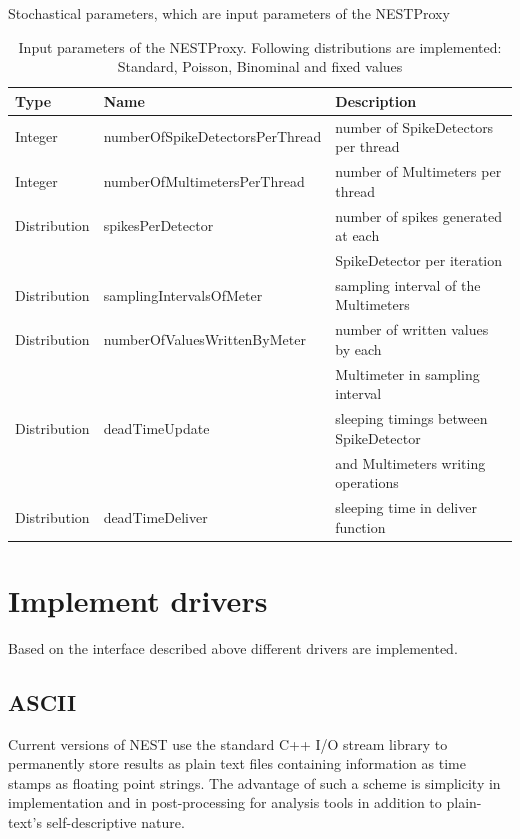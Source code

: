 \documentclass[]{YIC2015}
\begin{document}
\begin{table}[htdp]
\caption{Stochastical parameters, which are input parameters of the NESTProxy}
\centering
\begin{tabular}{lll}
\hline\hline
\textbf{Type} & \textbf{Name}                   & \textbf{Description} \\ \hline
Integer       & numberOfSpikeDetectorsPerThread & number of SpikeDetectors per thread  \\
Integer       & numberOfMultimetersPerThread    & number of Multimeters per thread  \\
Distribution  & spikesPerDetector               & number of spikes generated at each \\
	      &					& SpikeDetector per iteration  \\
Distribution  & samplingIntervalsOfMeter        & sampling interval of the Multimeters  \\
Distribution  & numberOfValuesWrittenByMeter    & number of written values by each \\
	      &					& Multimeter in sampling interval  \\
Distribution  & deadTimeUpdate                  & sleeping timings between SpikeDetector \\
	      &					& and Multimeters writing operations \\
Distribution  & deadTimeDeliver                 & sleeping time in deliver function  \\
\hline\hline
\end{tabular}
\label{tab:table-silva1}
\caption{Input parameters of the NESTProxy. Following distributions
are implemented: Standard, Poisson, Binominal and fixed values}
\end{table}

\section{Implement drivers}
Based on the interface described above different drivers are
implemented.

\subsection{ASCII}
\label{sec:ascii}
Current versions of NEST use the standard C++ I/O stream library
\cite{stream} to permanently store results as plain text files
containing information as time stamps as floating point strings. The
advantage of such a scheme is simplicity in implementation and in
post-processing for analysis tools in addition to plain-text's
self-descriptive nature.
\end{document}
